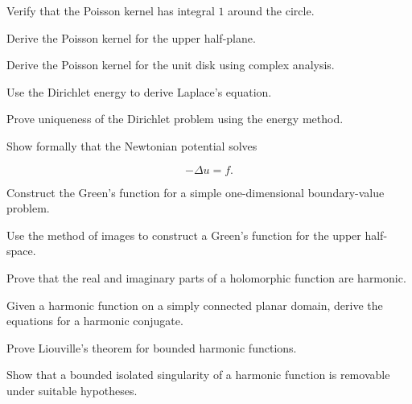\begin{exercise}[2]
Verify that the Poisson kernel has integral \(1\) around the circle.
\end{exercise}

\begin{exercise}[3]
Derive the Poisson kernel for the upper half-plane.
\end{exercise}

\begin{exercise}[3]
Derive the Poisson kernel for the unit disk using complex analysis.
\end{exercise}

\begin{exercise}[3]
Use the Dirichlet energy to derive Laplace's equation.
\end{exercise}

\begin{exercise}[3]
Prove uniqueness of the Dirichlet problem using the energy method.
\end{exercise}

\begin{exercise}[3]
Show formally that the Newtonian potential solves

\[
-\Delta u=f.
\]
\end{exercise}

\begin{exercise}[3]
Construct the Green's function for a simple one-dimensional boundary-value
problem.
\end{exercise}

\begin{exercise}[3]
Use the method of images to construct a Green's function for the upper
half-space.
\end{exercise}

\begin{exercise}[3]
Prove that the real and imaginary parts of a holomorphic function are
harmonic.
\end{exercise}

\begin{exercise}[3]
Given a harmonic function on a simply connected planar domain, derive the
equations for a harmonic conjugate.
\end{exercise}

\begin{exercise}[3]
Prove Liouville's theorem for bounded harmonic functions.
\end{exercise}

\begin{exercise}[3]
Show that a bounded isolated singularity of a harmonic function is
removable under suitable hypotheses.
\end{exercise}

